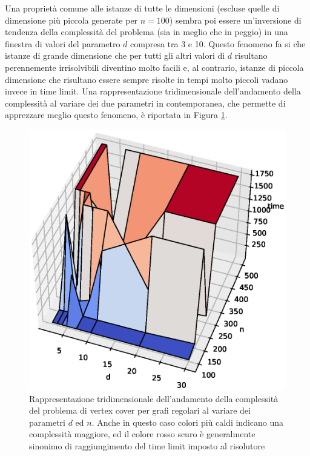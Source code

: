 Una proprietà comune alle istanze di tutte le dimensioni (escluse quelle di dimensione più piccola generate per $n=100$) sembra poi essere un'inversione di tendenza della complessità del problema (sia in meglio che in peggio) in una finestra di valori del parametro $d$ compresa tra 3 e 10. Questo fenomeno fa si che istanze di grande dimensione che per tutti gli altri valori di $d$ risultano perennemente irrisolvibili diventino molto facili e, al contrario, istanze di piccola dimensione che risultano essere sempre risolte in tempi molto piccoli vadano invece in time limit. Una rappresentazione tridimensionale dell'andamento della complessità al variare dei due parametri in contemporanea, che permette di apprezzare meglio questo fenomeno, è riportata in Figura \ref{fig:rrg3d}.

\begin{figure}[h!]
     \centering
       \includegraphics[scale=0.5]{images/rrg3d.eps}
       \caption{Rappresentazione tridimensionale dell'andamento della complessità del problema di vertex cover per grafi regolari al variare dei parametri $d$ ed $n$. Anche in questo caso colori più caldi indicano una complessità maggiore, ed il colore rosso scuro è generalmente sinonimo di raggiungimento del time limit imposto al risolutore}      
        \label{fig:rrg3d}
\end{figure}

